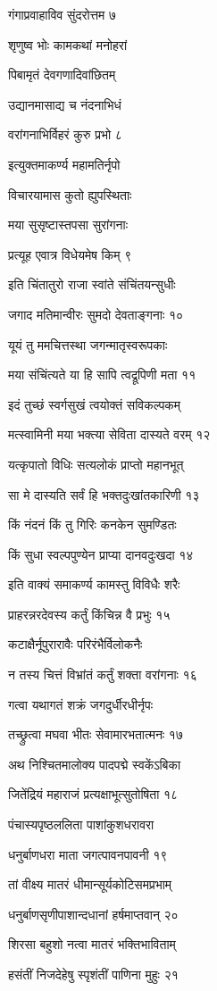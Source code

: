 गंगाप्रवाहाविव सुंदरोत्तम ७

शृणुष्व भोः कामकथां मनोहरां

पिबामृतं देवगणादिवांछितम्

उद्यानमासाद्य च नंदनाभिधं

वरांगनाभिर्विहरं कुरु प्रभो ८

इत्युक्तमाकर्ण्य महामतिर्नृपो

विचारयामास कुतो ह्युपस्थिताः

मया सुसृष्टास्तपसा सुरांगनाः

प्रत्यूह एवात्र विधेयमेष किम् ९

इति चिंतातुरो राजा स्वांते संचिंतयन्सुधीः

जगाद मतिमान्वीरः सुमदो देवताङ्गनाः १०

यूयं तु ममचित्तस्था जगन्मातृस्वरूपकाः

मया संचिंत्यते या हि सापि त्वद्रूपिणी मता ११

इदं तुच्छं स्वर्गसुखं त्वयोक्तं सविकल्पकम्

मत्स्वामिनी मया भक्त्या सेविता दास्यते वरम् १२

यत्कृपातो विधिः सत्यलोकं प्राप्तो महानभूत्

सा मे दास्यति सर्वं हि भक्तदुःखांतकारिणी १३

किं नंदनं किं तु गिरिः कनकेन सुमण्डितः

किं सुधा स्वल्पपुण्येन प्राप्या दानवदुःखदा १४

इति वाक्यं समाकर्ण्य कामस्तु विविधैः शरैः

प्राहरन्नरदेवस्य कर्तुं किंचिन्न वै प्रभुः १५

कटाक्षैर्नूपुरारावैः परिरंभैर्विलोकनैः

न तस्य चित्तं विभ्रांतं कर्तुं शक्ता वरांगनाः १६

गत्वा यथागतं शक्रं जगदुर्धीरधीर्नृपः

तच्छ्रुत्वा मघवा भीतः सेवामारभतात्मनः १७

अथ निश्चितमालोक्य पादपद्मे स्वकेंऽबिका

जितेंद्रियं महाराजं प्रत्यक्षाभूत्सुतोषिता १८

पंचास्यपृष्ठललिता पाशांकुशधरावरा

धनुर्बाणधरा माता जगत्पावनपावनी १९

तां वीक्ष्य मातरं धीमान्सूर्यकोटिसमप्रभाम्

धनुर्बाणसृणीपाशान्दधानां हर्षमाप्तवान् २०

शिरसा बहुशो नत्वा मातरं भक्तिभाविताम्

हसंतीं निजदेहेषु स्पृशंतीं पाणिना मुहुः २१

